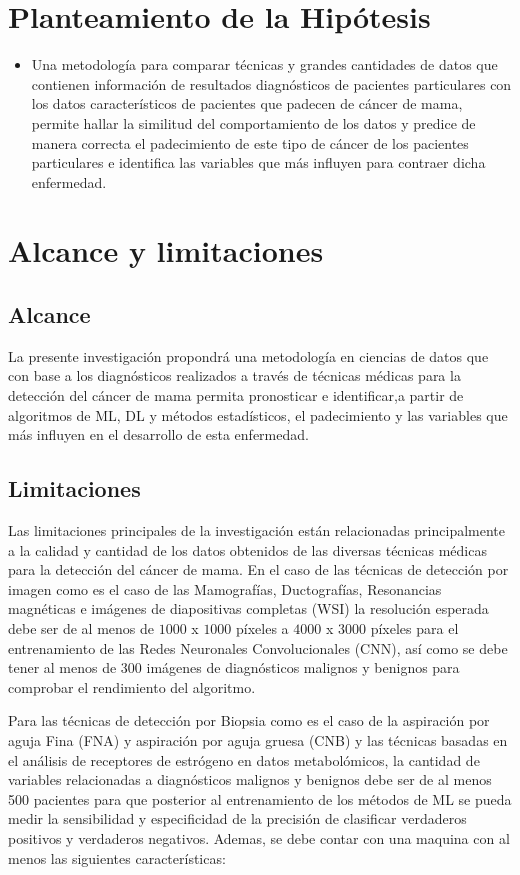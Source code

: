 \section{Planteamiento de la Hipótesis}
\begin{itemize}
	\item Una metodología para comparar técnicas y grandes cantidades de datos que contienen información de resultados diagnósticos de pacientes particulares con los datos característicos de pacientes que padecen de cáncer de mama, permite hallar la similitud del comportamiento de los datos y predice de manera correcta el padecimiento de este tipo de cáncer de los pacientes particulares e identifica las variables que más influyen para contraer dicha enfermedad. 
\end{itemize}

\newpage
\section{Alcance y limitaciones}
\subsection{Alcance}
La presente investigación propondrá una metodología en ciencias de datos que con base a los diagnósticos realizados a través de técnicas médicas para la detección del cáncer de mama permita pronosticar e identificar,a partir de algoritmos de ML, DL y métodos estadísticos, el padecimiento y las variables que más influyen en el desarrollo de esta enfermedad.

\subsection{Limitaciones}
Las limitaciones principales de la investigación están relacionadas principalmente a la calidad y cantidad de los datos obtenidos de las diversas técnicas médicas para la detección del cáncer de mama. En el caso de las técnicas de detección por imagen como es el caso de las Mamografías, Ductografías, Resonancias magnéticas e imágenes de diapositivas completas (WSI) la resolución esperada debe ser de al menos de $1000$ x $1000$ píxeles  a $4000$ x $3000$ píxeles para el entrenamiento de las Redes Neuronales Convolucionales (CNN), así como se debe tener al menos de 300 imágenes de diagnósticos malignos y benignos para comprobar el rendimiento del algoritmo. 

Para las técnicas de detección por Biopsia como es el caso de la aspiración por aguja Fina (FNA) y aspiración por aguja gruesa (CNB) y las técnicas basadas en el análisis de receptores de estrógeno en datos metabolómicos, la cantidad de variables relacionadas a diagnósticos malignos y benignos debe ser de al menos 500 pacientes para que posterior al entrenamiento de los métodos de ML se pueda medir la sensibilidad y especificidad  de la precisión de clasificar verdaderos positivos y verdaderos negativos. Ademas, se debe contar con una maquina con al menos las siguientes características:


